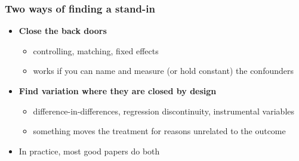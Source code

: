 \begin{frame}
\frametitle{Two ways of finding a stand-in}
\centering

\begin{itemize}
  \item[1.] \textbf{Close the back doors}
  \begin{itemize}
    \item controlling, matching, fixed effects
    \item works if you can name and measure (or hold constant) the confounders
  \end{itemize}
  \vspace{12pt}
  \item<2->[2.] \textbf{Find variation where they are closed by design}
  \begin{itemize}
    \item difference-in-differences, regression discontinuity, instrumental variables
    \item something moves the treatment for reasons unrelated to the outcome
  \end{itemize}
  \vspace{12pt}
  \item<3-> In practice, most good papers do both
\end{itemize}

\end{frame}

